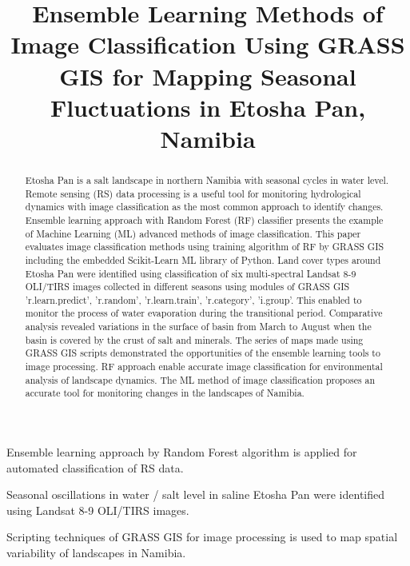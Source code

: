 \documentclass[draft]{agujournal2019}
\begin{document}

\title{Ensemble Learning Methods of Image Classification Using GRASS GIS for Mapping Seasonal Fluctuations in Etosha Pan, Namibia}






\begin{keypoints}
\item Ensemble learning approach by Random Forest algorithm is applied for automated classification of RS data. 
\item Seasonal oscillations in water / salt level in saline Etosha Pan were identified using Landsat 8-9 OLI/TIRS images.
\item Scripting techniques of GRASS GIS for image processing is used to map spatial variability of landscapes in Namibia.
\end{keypoints}


\begin{abstract}
Etosha Pan is a salt landscape in northern Namibia with seasonal cycles in water level. Remote sensing (RS) data  processing is a useful tool for monitoring hydrological dynamics with image classification as the most common approach to identify changes. Ensemble learning approach with Random Forest (RF) classifier presents the example of Machine Learning (ML) advanced methods of image classification. This paper evaluates image classification methods using training algorithm of RF by GRASS GIS including the embedded Scikit-Learn ML library of Python. Land cover types around Etosha Pan were identified using classification of six multi-spectral Landsat 8-9 OLI/TIRS images collected in different seasons using modules of GRASS GIS 'r.learn.predict', 'r.random', 'r.learn.train', 'r.category', 'i.group'. This enabled to monitor the process of water evaporation during the transitional period. Comparative analysis revealed variations in the surface of basin from March to August when the basin is covered by the crust of salt and minerals. The series of maps made using GRASS GIS scripts demonstrated the opportunities of the ensemble learning tools to image processing. RF approach enable accurate image classification for environmental analysis of landscape dynamics. The ML method of image classification proposes an accurate tool for monitoring changes in the landscapes of Namibia.
\end{abstract}
\end{document}
